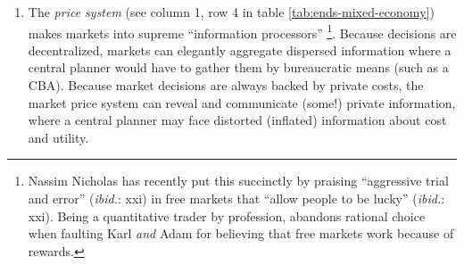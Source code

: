 \begin{enumerate}
	\item The \emph{price system} (see column 1, row 4 in table \ref{tab:ends-mixed-economy}) makes markets into supreme ``information processors'' \citep{Hayek1931}\footnote{
		Nassim Nicholas \cite{Taleb2007} has recently put this succinctly by praising ``aggressive trial and error'' (\emph{ibid.}: xxi) in free markets that ``allow people to be lucky'' (\emph{ibid.}: xxi). Being a quantitative trader by profession, \cite{Taleb2007} abandons rational choice when faulting Karl \cite{Marx-1867-aa} \emph{and} Adam \cite{Smith-1776-lq} for believing that free markets work because of rewards.}.
	Because decisions are decentralized, markets can elegantly aggregate dispersed information where a central planner would have to gather them by bureaucratic means (such as a \gls{CBA}). Because market decisions are always backed by private costs, the market price system can reveal and communicate (some!) private information, where a central planner may face distorted (inflated) information about cost and utility.
\end{enumerate}

